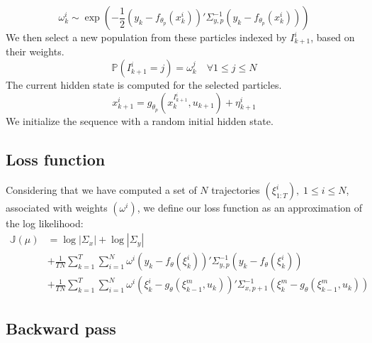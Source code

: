 \documentclass[10pt,a4paper]{report}
\begin{document}
$$\omega_k^i \sim \exp(-\frac{1}{2}(y_k - f_{\theta_p}(x_k^i))'\Sigma^{-1}_{y, p}(y_k - f_{\theta_p}(x_k^i)))$$
We then select a new population from these particles indexed by $I_{k+1}^i$, based on their weights.
$$\mathbb{P}(I_{k+1}^i=j) = \omega_k^j \quad \forall 1 \leq j \leq N$$
The current hidden state is computed for the selected particles.
$$x^i_{k+1} = g_{\theta_p}(x_k^{I_{k+1}^i}, u_{k+1}) + \eta^i_{k+1}$$
We initialize the sequence with a random initial hidden state.

\subsection{Loss function}
Considering that we have computed a set of $N$ trajectories $(\xi^i_{1:T}),\;1 \leq i \leq N$, associated with weights $(\omega^i)$, we define our loss function as an approximation of the log likelihood:
\begin{align*}
    \mathbb{J}(\mu) & = \log |\Sigma_x| + \log |\Sigma_y|                                                                                                                \\
                    & + \frac{1}{TN}\sum_{k=1}^T \sum_{i=1}^N \omega^i (y_k - f_\theta(\xi_k^i))' \Sigma_{y, p}^{-1} (y_k - f_\theta(\xi_k^i))                           \\
                    & + \frac{1}{TN}\sum_{k=1}^T \sum_{i=1}^N \omega^i (\xi_k^i - g_\theta(\xi_{k-1}^m, u_k))'\Sigma_{x, p+1}^{-1}(\xi_k^m - g_\theta(\xi_{k-1}^m, u_k))
\end{align*}

\subsection{Backward pass}
\end{document}
